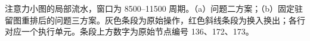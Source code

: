 注意力小图的局部流水，窗口为 8500–11500 周期。（a）问题二方案；（b）固定驻留图重排后的问题三方案。灰色条段为原始操作，红色斜线条段为换入换出；各行对应一个执行单元。条段上方数字为原始节点编号 136、172、173。
